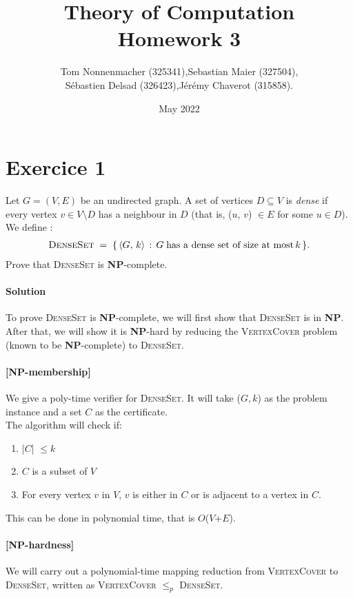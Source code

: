 \documentclass{article}
\title{Theory of Computation \\ Homework 3}
\author{Tom Nonnenmacher (325341),\quad Sebastian Maier (327504),\\ Sébastien Delsad (326423),\quad Jérémy Chaverot (315858).}
\date{May 2022}
\begin{document}
\maketitle


\section*{Exercice 1}
Let $G=(V,E)$ be an undirected graph. A set of vertices $D\subseteq V$ is \textit{dense} if every vertex $v \in V\setminus D$ has a neighbour in $D$ (that is, ($u$, $v$) $\in E$ for some $u\in D$). We define :
\begin{align*}
    \textsc{DenseSet}\; =\;\{\,\langle G,\, k\rangle\,:\,G\;\text{has a dense set of size at most}\, k\,\}.
\end{align*}
\noindent Prove that \textsc{DenseSet} is \textbf{NP}-complete.
\bigskip
\paragraph{Solution} To prove \textsc{DenseSet} is \textbf{NP}-complete, we will first show that \textsc{DenseSet} is in \textbf{NP}. After that, we will show it is \textbf{NP}-hard by reducing the \textsc{VertexCover} problem (known to be \textbf{NP}-complete) to \textsc{DenseSet}.

\paragraph{[NP-membership]} We give a poly-time verifier for \textsc{DenseSet}. It will take ($G,k$) as the problem instance and a set $C$ as the certificate. \\The algorithm will check if:
\begin{enumerate}[noitemsep, topsep=0pt]
    \item |$C$| $\leq k$
    \item $C$ is a subset of $V$
    \item For every vertex $v$ in $V$, $v$ is either in $C$ or is adjacent to a vertex in $C$.
\end{enumerate}
This can be done in polynomial time, that is $O$($V$+$E$).


\paragraph{[NP-hardness]} We will carry out a polynomial-time mapping reduction from \textsc{VertexCover} to \textsc{DenseSet}, written as \textsc{VertexCover} $\leq _p$ \textsc{DenseSet}.\newline
\end{document}
